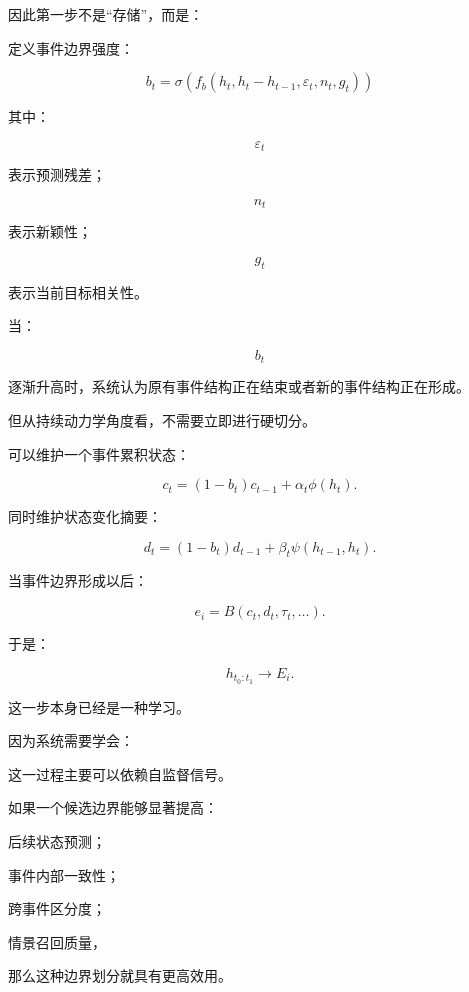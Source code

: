 因此第一步不是“存储”，而是：

\begin{statementbox}
\centering
{}
\end{statementbox}

定义事件边界强度：

\[
b_t
=
\sigma
\left(
f_b
\left(
h_t,
h_t-h_{t-1},
\varepsilon_t,
n_t,
g_t
\right)
\right)
\]

其中：

\[
\varepsilon_t
\]

表示预测残差；

\[
n_t
\]

表示新颖性；

\[
g_t
\]

表示当前目标相关性。

当：

\[
b_t
\]

逐渐升高时，系统认为原有事件结构正在结束或者新的事件结构正在形成。

但从持续动力学角度看，不需要立即进行硬切分。

可以维护一个事件累积状态：

\[
c_t
=
(1-b_t)c_{t-1}
+
\alpha_t\phi(h_t).
\]

同时维护状态变化摘要：

\[
d_t
=
(1-b_t)d_{t-1}
+
\beta_t
\psi(h_{t-1},h_t).
\]

当事件边界形成以后：

\[
\boxed{
e_i
=
B(c_t,d_t,\tau_t,\ldots).
}
\]

于是：

\[
\boxed{
h_{t_0:t_1}
\rightarrow
E_i.
}
\]

这一步本身已经是一种学习。

因为系统需要学会：

\begin{statementbox}
\centering
{}
\end{statementbox}

这一过程主要可以依赖自监督信号。

如果一个候选边界能够显著提高：

后续状态预测；

事件内部一致性；

跨事件区分度；

情景召回质量，

那么这种边界划分就具有更高效用。

